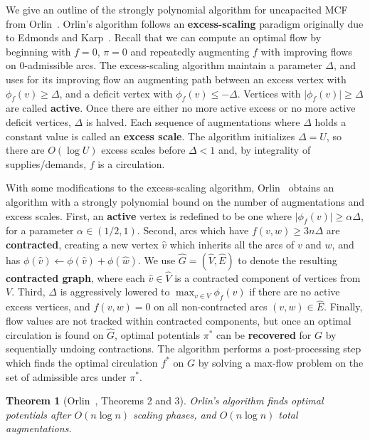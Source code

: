 \documentclass[11pt]{article}
\def\abs#1{\mathopen| #1 \mathclose|}		%
\def\fsupply{\phi}
\theoremstyle{plain}
\newtheorem{theorem}[lemma]{Theorem}
\numberwithin{figure}{section}
\def\EMPH#1{\textbf{\boldmath #1}}
\begin{document}
We give an outline of the strongly polynomial algorithm for uncapacited MCF
from Orlin~\cite{O93}.
Orlin's algorithm follows an \EMPH{excess-scaling} paradigm originally due to
Edmonds and Karp~\cite{EK72}.
Recall that we can compute an optimal flow by beginning with $f = 0$, $\pi = 0$
and repeatedly augmenting $f$ with improving flows on 0-admissible arcs.
The excess-scaling algorithm maintain a parameter $\Delta$, and uses for its
improving flow an augmenting path between an excess vertex with
$\fsupply_f(v) \geq \Delta$, and a deficit vertex with $\fsupply_f(v) \leq -\Delta$.
Vertices with $\abs{\fsupply_f(v)} \geq \Delta$ are called \EMPH{active}.
Once there are either no more active excess or no more active deficit vertices,
$\Delta$ is halved.
Each sequence of augmentations where $\Delta$ holds a constant value is called
an \EMPH{excess scale}.
The algorithm initializes $\Delta = U$, so there are $O(\log U)$ excess scales
before $\Delta < 1$ and, by integrality of supplies/demands, $f$ is a
circulation.

With some modifications to the excess-scaling algorithm, Orlin~\cite{O93}
obtains an algorithm with a strongly polynomial bound on the number of
augmentations and excess scales.
First, an \EMPH{active} vertex is redefined to be one where
$\abs{\fsupply_f(v)} \geq \alpha\Delta$, for a parameter $\alpha \in (1/2, 1)$.
Second, arcs which have $f(v, w) \geq 3n\Delta$ are \EMPH{contracted},
creating a new vertex $\hat{v}$ which inherits all the arcs of $v$ and $w$,
and has $\fsupply(\hat{v}) \gets \fsupply(\hat{v}) + \fsupply(\hat{w})$.
We use $\hat{G} = (\hat{V}, \hat{E})$ to denote the resulting
\EMPH{contracted graph}, where each $\hat{v} \in \hat{V}$ is a contracted
component of vertices from $V$.
Third, $\Delta$ is aggressively lowered to $\max_{v \in V} \fsupply_f(v)$ if there are
no active excess vertices, and $f(v, w) = 0$ on all non-contracted arcs
$(v, w) \in \hat{E}$.
Finally, flow values are not tracked within contracted components, but once an
optimal circulation is found on $\hat{G}$, optimal potentials $\pi^*$ can be
\EMPH{recovered} for $G$ by sequentially undoing contractions.
The algorithm performs a post-processing step which finds the optimal
circulation $f^*$ on $G$ by solving a max-flow problem on the set of admissible
arcs under $\pi^*$.

\begin{theorem}[Orlin~\cite{O93}, Theorems 2 and 3]
\label{theorem:orlin_old}
Orlin's algorithm finds optimal potentials after $O(n\log n)$ scaling phases,
and $O(n\log n)$ total augmentations.
\end{theorem}
\end{document}
